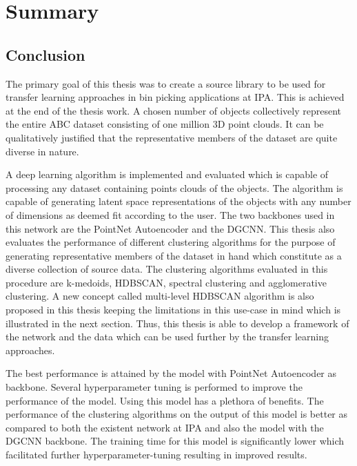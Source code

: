 \section{Summary}
\subsection{Conclusion}
The primary goal of this thesis was to create a source library to be used for transfer learning approaches in bin picking applications at \ac{IPA}. This is achieved at the end of the thesis work. A chosen number of objects collectively represent the entire ABC dataset \cite{Koch_2019_CVPR} consisting of one million 3D point clouds. It can be qualitatively justified that the representative members of the dataset are quite diverse in nature.

\vspace{5mm}

A deep learning algorithm is implemented and evaluated which is capable of processing any dataset containing points clouds of the objects. The algorithm is capable of generating latent space representations of the objects with any number of dimensions as deemed fit according to the user. The two backbones used in this network are the PointNet Autoencoder and the \ac{DGCNN}. This thesis also evaluates the performance of different clustering algorithms for the purpose of generating representative members of the dataset in hand which constitute as a diverse collection of source data. The clustering algorithms evaluated in this procedure are k-medoids, \ac{HDBSCAN}, spectral clustering and agglomerative clustering. A new concept called multi-level \ac{HDBSCAN} algorithm is also proposed in this thesis keeping the limitations in this use-case in mind which is illustrated in the next section.  Thus, this thesis is able to develop a framework of the network and the data which can be used further by the transfer learning approaches. 

\vspace{5mm}

The best performance is attained by the model with PointNet Autoencoder as backbone. Several hyperparameter tuning is performed to improve the performance of the model. Using this model has a plethora of benefits. The performance of the clustering algorithms on the output of this model is better as compared to both the existent network at \ac{IPA} and also the model with the \ac{DGCNN} backbone. The training time for this model is significantly lower which facilitated further hyperparameter-tuning resulting in improved results. 


